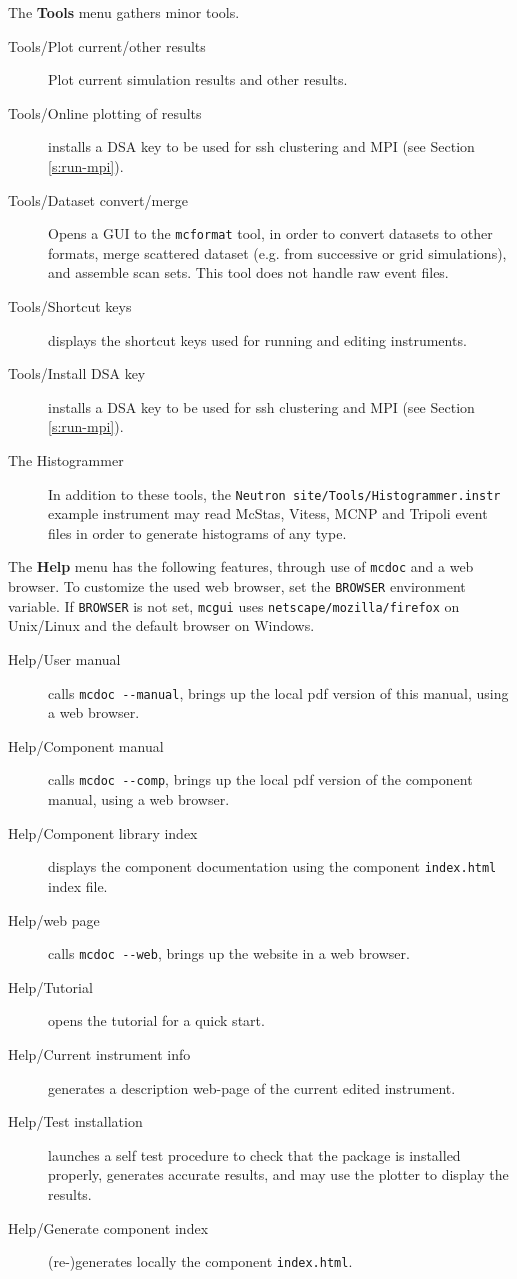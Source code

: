 \noindent The {\bf Tools} menu gathers minor tools.
\begin{description}
\item[Tools/Plot current/other results] Plot current simulation results and
  other results.
\item[Tools/Online plotting of results] installs a DSA key to be used for ssh
  clustering and MPI (see Section \ref{s:run-mpi}).
\item[Tools/Dataset convert/merge] Opens a GUI to the \verb+mcformat+ tool, in
  order to convert datasets to other formats, merge scattered dataset (e.g. from
  successive or grid simulations), and assemble scan sets. This tool does not
  handle raw event files.
\item[Tools/Shortcut keys] displays the shortcut keys used for running and
  editing instruments.
\item[Tools/Install DSA key] installs a DSA key to be used for ssh clustering
  and MPI (see Section \ref{s:run-mpi}).
\item[The Histogrammer] In addition to these tools, the
  \verb+Neutron site/Tools/Histogrammer.instr+ example instrument may read
  McStas, Vitess, MCNP and Tripoli event files in order to generate histograms
  of any type.
\end{description}


\noindent The {\bf Help} menu has the following features, through use of
\verb+mcdoc+ and a web browser. To customize the used web browser, set
the \verb+BROWSER+ environment variable. If \verb+BROWSER+ is not set,
\verb+mcgui+ uses \verb+netscape/mozilla/firefox+ on Unix/Linux and the default browser on
Windows.
\begin{description}
\item[Help/\MCS User manual] calls \verb+mcdoc --manual+, brings up the local
  pdf version of this manual, using a web browser.
\item[Help/\MCS Component manual] calls \verb+mcdoc --comp+, brings up the local
  pdf version of the component manual, using a web browser.
\item[Help/Component library index] displays the component documentation using
  the component \verb+index.html+ index file.
\item[Help/\MCS web page] calls \verb+mcdoc --web+, brings up the \MCS
  website in a web browser.
\item[Help/Tutorial] opens the \MCS tutorial for a quick start.
\item[Help/Current instrument info] generates a description web-page of the
  current edited instrument.
\item[Help/Test \MCS installation] launches a self test procedure to check that
  the \MCS package is installed properly, generates accurate results, and may
  use the plotter to display the results.
\item[Help/Generate component index] (re-)generates locally the component
  \verb+index.html+.
\end{description}


